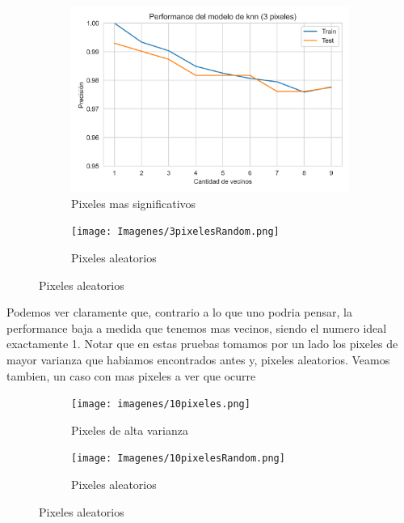 \documentclass[10pt,a4paper]{article}
\begin{document}
\begin{figure}[ht!]
	\begin{subfigure}{0.5\textwidth}
		\includegraphics[width=1\linewidth]{Imagenes/3pixeles.png} 
		\caption{Pixeles mas significativos}
		\label{fig:subfig1}
	\end{subfigure}
	\begin{subfigure}{0.5\textwidth}
		\texttt{[image: Imagenes/3pixelesRandom.png]}
		\caption{Pixeles aleatorios}
		\label{fig:subfig2}
	\end{subfigure}
	\label{fig:subfigs}
\end{figure}

Podemos ver claramente que, contrario a lo que uno podria pensar, la performance baja a medida que tenemos mas vecinos, siendo el numero ideal exactamente 1. Notar que en estas pruebas tomamos por un lado los pixeles de mayor varianza que habiamos encontrados antes y, pixeles aleatorios.
\vspace{0.05cm}
Veamos tambien, un caso con mas pixeles a ver que ocurre

\begin{figure}[ht!]
	\begin{subfigure}{0.5\textwidth}
		\texttt{[image: imagenes/10pixeles.png]} 
		\caption{Pixeles de alta varianza}
		\label{fig:subfig1}
	\end{subfigure}
	\begin{subfigure}{0.5\textwidth}
		\texttt{[image: Imagenes/10pixelesRandom.png]}
		\caption{Pixeles aleatorios}
		\label{fig:subfig2}
	\end{subfigure}
	\label{fig:subfigs}
\end{figure}
\end{document}
